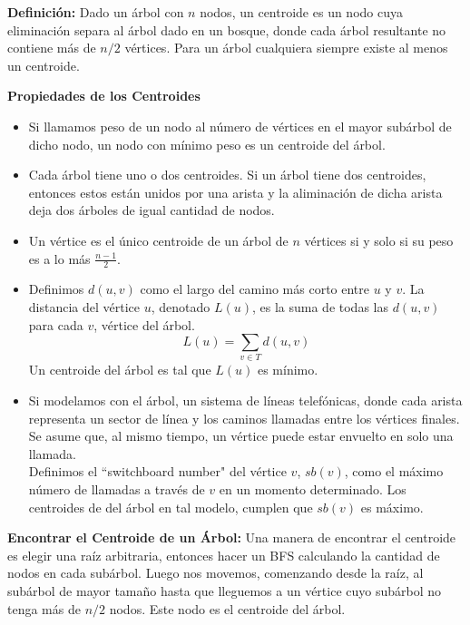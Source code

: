 \begin{itemize}
    \item{
		\textbf{Definici\'on:} 
		Dado un \'arbol con $n$ nodos, un centroide es un nodo cuya eliminaci\'on separa al \'arbol 
		dado en un bosque, donde cada \'arbol resultante no contiene m\'as de $n/2$ v\'ertices. Para 
		un \'arbol cualquiera siempre existe al menos un centroide.
    }
    
    \item{
		\textbf{Propiedades de los Centroides}
		\begin{itemize}
			\item{
				Si llamamos peso de un nodo al n\'umero de v\'ertices en el mayor sub\'arbol de dicho
				nodo, un nodo con m\'inimo peso es un centroide del \'arbol. 
			}
			\item{
				Cada \'arbol tiene uno o dos centroides. Si un \'arbol tiene dos centroides, entonces 
				estos est\'an unidos por una arista y la aliminaci\'on de dicha arista deja dos \'arboles
				de igual cantidad de nodos.
			}
			\item{
				Un v\'ertice es el \'unico centroide de un \'arbol de $n$ v\'ertices si y solo si su peso 
				es a lo m\'as $\frac{n-1}{2}$. 
			}
			\item{
				Definimos $d(u, v)$ como el largo del camino m\'as corto entre $u$ y $v$. La distancia del 
				v\'ertice $u$, denotado $L(u)$, es la suma de todas las $d(u, v)$ para cada $v$, v\'ertice 
				del \'arbol.
				$$ L(u) = \sum_{v \in T} d(u, v) $$
				Un centroide del \'arbol es tal que $L(u)$ es m\'inimo.   
		    }
			\item{
				Si modelamos con el \'arbol, un sistema de l\'ineas telef\'onicas, donde cada arista representa
				un sector de l\'inea y los caminos llamadas entre los v\'ertices finales. Se asume que, al mismo 
				tiempo, un v\'ertice puede estar envuelto en solo una llamada. \\ 
				Definimos el ``switchboard number"  del v\'ertice $v$, $sb(v)$, como el m\'aximo n\'umero de llamadas
				a trav\'es de $v$ en un momento determinado. Los centroides de del \'arbol en tal modelo, cumplen 
				que $sb(v)$ es m\'aximo.    
			}
		\end{itemize}
		
		\item{
			\textbf{Encontrar el Centroide de un \'Arbol:}
              Una manera de encontrar el centroide es elegir una ra\'iz arbitraria, entonces hacer un BFS calculando 
              la cantidad de nodos en cada sub\'arbol. Luego nos movemos, comenzando desde la ra\'iz, al sub\'arbol
              de mayor tama\~no hasta que lleguemos a un v\'ertice cuyo sub\'arbol no tenga m\'as de $n/2$ nodos. Este
              nodo es el centroide del \'arbol.
		}
		
}
\end{itemize}
